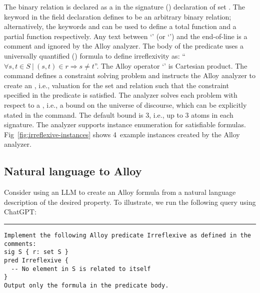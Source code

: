 The binary relation  is declared as a  in the
signature () declaration of set .  The keyword
 in the field declaration defines  to be an
arbitrary binary relation; alternatively, the keywords 
and  can be used to define a total function and a partial
function respectively.  Any text between `\CodeIn{-{}-}' (or
`\CodeIn{$//$}') and the end-of-line is a comment and ignored by the
Alloy analyzer.  The body of the predicate  uses a
universally quantified () formula to define irreflexivity
as:
``$\forall s,t \in S ~|~ (s, t) \in r \Rightarrow s \neq t$''.
The Alloy operator `\CodeIn{->}' is Cartesian product.  The
 command defines a constraint solving problem and
instructs the Alloy analyzer to create an , i.e.,
valuation for the set  and relation  such that the
constraint specified in the predicate  is
satisfied.  The analyzer solves each problem with respect to a
, i.e., a bound on the universe of discourse, which can
be explicitly stated in the  command.  The default bound
is 3, i.e., up to 3 atoms in each signature.  The analyzer supports
instance enumeration for satisfiable formulas.
Fig~\ref{fig:irreflexive-instances} shows 4~example instances created
by the Alloy analyzer.

\subsection{Natural language to Alloy}

Consider using an LLM to create an Alloy formula from a natural
language description of the desired property.  To illustrate, we run
the following query using ChatGPT:

\noindent\hfil\rule{0.99\textwidth}{1pt}\hfil

\vspace*{-2ex}
\begin{CodeOut}
\begin{verbatim}
Implement the following Alloy predicate Irreflexive as defined in the comments:
sig S { r: set S }
pred Irreflexive {
  -- No element in S is related to itself
}
Output only the formula in the predicate body.
\end{verbatim}
\end{CodeOut}

\vspace*{-3ex}

